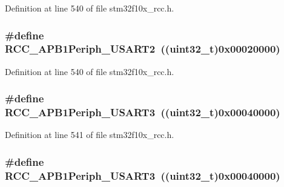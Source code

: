 Definition at line 540 of file stm32f10x\+\_\+rcc.\+h.

\subsubsection[{\texorpdfstring{R\+C\+C\+\_\+\+A\+P\+B1\+Periph\+\_\+\+U\+S\+A\+R\+T2}{RCC_APB1Periph_USART2}}]{\setlength{\rightskip}{0pt plus 5cm}\#define R\+C\+C\+\_\+\+A\+P\+B1\+Periph\+\_\+\+U\+S\+A\+R\+T2~(({\bf uint32\+\_\+t})0x00020000)}\hypertarget{group___a_p_b1__peripheral_gaa69c77220b943a42a4bacb8a3bf87dd0}{}\label{group___a_p_b1__peripheral_gaa69c77220b943a42a4bacb8a3bf87dd0}


Definition at line 540 of file stm32f10x\+\_\+rcc.\+h.

\subsubsection[{\texorpdfstring{R\+C\+C\+\_\+\+A\+P\+B1\+Periph\+\_\+\+U\+S\+A\+R\+T3}{RCC_APB1Periph_USART3}}]{\setlength{\rightskip}{0pt plus 5cm}\#define R\+C\+C\+\_\+\+A\+P\+B1\+Periph\+\_\+\+U\+S\+A\+R\+T3~(({\bf uint32\+\_\+t})0x00040000)}\hypertarget{group___a_p_b1__peripheral_gaf72838a63d7d6200f251c1eb334cbaac}{}\label{group___a_p_b1__peripheral_gaf72838a63d7d6200f251c1eb334cbaac}


Definition at line 541 of file stm32f10x\+\_\+rcc.\+h.

\subsubsection[{\texorpdfstring{R\+C\+C\+\_\+\+A\+P\+B1\+Periph\+\_\+\+U\+S\+A\+R\+T3}{RCC_APB1Periph_USART3}}]{\setlength{\rightskip}{0pt plus 5cm}\#define R\+C\+C\+\_\+\+A\+P\+B1\+Periph\+\_\+\+U\+S\+A\+R\+T3~(({\bf uint32\+\_\+t})0x00040000)}\hypertarget{group___a_p_b1__peripheral_gaf72838a63d7d6200f251c1eb334cbaac}{}\label{group___a_p_b1__peripheral_gaf72838a63d7d6200f251c1eb334cbaac}


